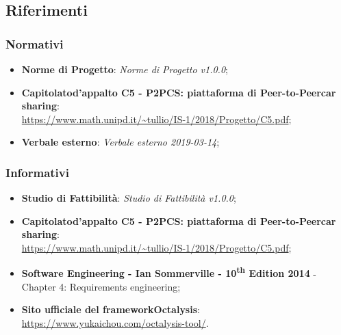 \subsection{Riferimenti}
\subsubsection{Normativi}
\begin{itemize}
	\item \textbf{Norme di Progetto}: \textit{Norme di Progetto v1.0.0};

	\item \textbf{Capitolato\glosp d'appalto C5 - P2PCS: piattaforma di Peer-to-Peer\glosp car sharing}: \\ \url{ https://www.math.unipd.it/~tullio/IS-1/2018/Progetto/C5.pdf};
	\item \textbf{Verbale esterno}: \textit{Verbale esterno 2019-03-14};

\end{itemize}
\subsubsection{Informativi}
\begin{itemize}
	\item \textbf{Studio di Fattibilità}: \textit{Studio di Fattibilità v1.0.0};
	\item \textbf{Capitolato\glosp d'appalto C5 - P2PCS: piattaforma di Peer-to-Peer\glosp car sharing}: \\ \url{ https://www.math.unipd.it/~tullio/IS-1/2018/Progetto/C5.pdf};
	\item \textbf{Software Engineering - Ian Sommerville - 10\textsuperscript{th} Edition 2014}
	\subitem - Chapter 4: Requirements engineering;
	\item \textbf{Sito ufficiale del framework\glosp Octalysis\glo}: \\ \textsf{\url{https://www.yukaichou.com/octalysis-tool/}}. 

\end{itemize}